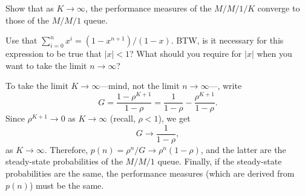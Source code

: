 \documentclass[companion]{subfiles}
\begin{document}
\begin{extra}
 Show that as $K\to\infty$, the performance measures of the $M/M/1/K$ converge to those of the $M/M/1$ queue. 
\begin{hint}
Use that $\sum_{i=0}^n x^i = (1-x^{n+1})/(1-x)$. BTW, is it
 necessary for this expression to be true that $|x|<1$? What should
 you require for $|x|$ when you want to take the limit
 $n\to\infty$?
\end{hint}
\begin{solution}
To take the limit $K\to\infty$---mind, not the limit $n\to\infty$---, write
\begin{equation*}
G= \frac{1-\rho^{K+1}}{1-\rho} = \frac{1}{1-\rho} -\frac{\rho^{K+1}}{1-\rho}.
\end{equation*}
Since $\rho^{K+1}\to 0$ as $K\to \infty$ (recall, $\rho<1$), we get
\begin{equation*}
G \to \frac{1}{1-\rho}, 
\end{equation*}
as $K\to\infty$. Therefore, $p(n)=\rho^n/G \to \rho^n(1-\rho)$, and
the latter are the steady-state probabilities of the $M/M/1$
queue. Finally, if the steady-state probabilities are the same, the
performance measures (which are derived from $p(n)$) must be the same.
\end{solution}
\end{extra}
\end{document}
